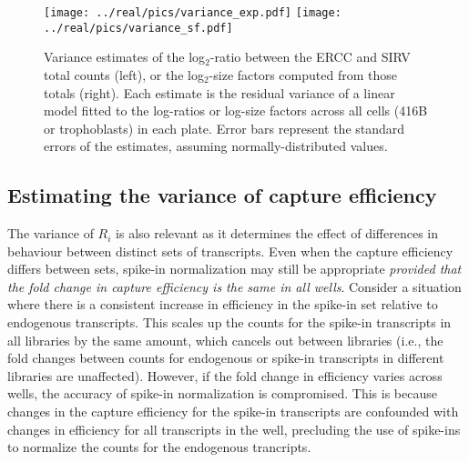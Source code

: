 \documentclass{article}
\begin{document}
\begin{figure}[btp]
    \begin{center}
        \texttt{[image: ../real/pics/variance\_exp.pdf]}
        \texttt{[image: ../real/pics/variance\_sf.pdf]}
    \end{center}
    \caption{Variance estimates of the log$_2$-ratio between the ERCC and SIRV total counts (left), or the log$_2$-size factors computed from those totals (right).
        Each estimate is the residual variance of a linear model fitted to the log-ratios or log-size factors across all cells (416B or trophoblasts) in each plate.
        Error bars represent the standard errors of the estimates, assuming normally-distributed values.
    }
    \label{fig:varestimates}
\end{figure}

\subsection{Estimating the variance of capture efficiency}
The variance of $R_i$ is also relevant as it determines the effect of differences in behaviour between distinct sets of transcripts.
Even when the capture efficiency differs between sets, spike-in normalization may still be appropriate \textit{provided that the fold change in capture efficiency is the same in all wells}.
Consider a situation where there is a consistent increase in efficiency in the spike-in set relative to endogenous transcripts.
This scales up the counts for the spike-in transcripts in all libraries by the same amount, which cancels out between libraries (i.e., the fold changes between counts for endogenous or spike-in transcripts in different libraries are unaffected).
However, if the fold change in efficiency varies across wells, the accuracy of spike-in normalization is compromised.
This is because changes in the capture efficiency for the spike-in transcripts are confounded with changes in efficiency for all transcripts in the well, precluding the use of spike-ins to normalize the counts for the endogenous trancripts.
\end{document}

